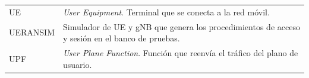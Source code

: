\begin{singlespace}
\begin{longtable}{@{}>{\raggedright\arraybackslash}p{}>{\raggedright\arraybackslash}p{}@{}}
    UE & \textit{User Equipment}. Terminal que se conecta a la red móvil. \\

    UERANSIM & Simulador de UE y gNB que genera los procedimientos de acceso y sesión en el banco de pruebas. \\

    UPF & \textit{User Plane Function}. Función que reenvía el tráfico del plano de usuario. \\

\end{longtable}
\end{singlespace}

\clearpage

